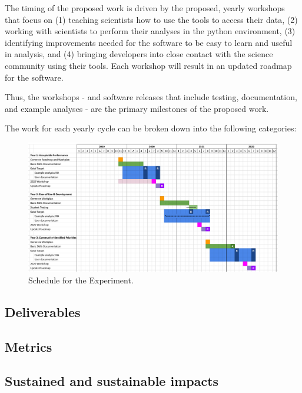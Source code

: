 The timing of the proposed work is driven by the proposed, yearly workshops that focus on (1) teaching scientists how to use the tools to access their data, (2) working with scientists to perform their analyses in the python environment, (3) identifying improvements needed for the software to be easy to learn and useful in analysis, and (4) bringing developers into close contact with the science community using their tools.  Each workshop will result in an updated roadmap for the software.

Thus, the workshops - and software releases that include testing, documentation, and example analyses - are the primary milestones of the proposed work.

The work for each yearly cycle can be broken down into the following categories:


\begin{figure}[htb]
    \begin{center}
      \includegraphics[width=\textwidth]{Figures/schedule1}
    \end{center}
    \caption{Schedule for the \scs Experiment.}
    \label{fig:ops-schedule}
\end{figure}

\subsection{Deliverables}


\subsection{Metrics}


\subsection{Sustained and sustainable impacts}